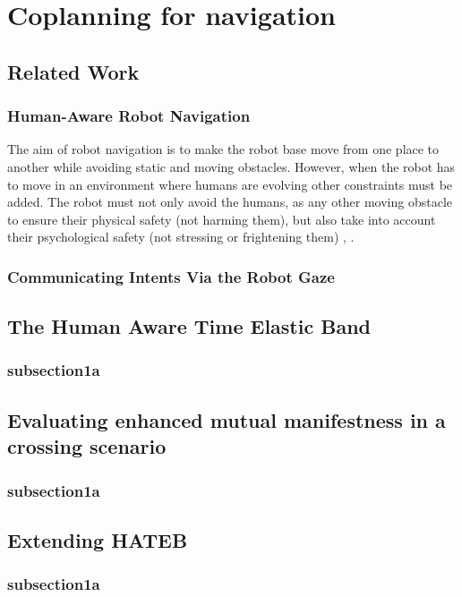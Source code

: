 \documentclass[a4paper,11pt,twoside]{StyleThese}
\begin{document}
\setcounter{chapter}{1} %
\dominitoc
\faketableofcontents
\fi

\chapter{Coplanning for navigation}
\minitoc

\section{Related Work}
\subsection{Human-Aware Robot Navigation}
The aim of robot navigation is to make the robot base move from one place to another while avoiding static and moving obstacles. However, when the robot has to move in an environment where humans are evolving other constraints must be added. The robot must not only avoid the humans, as any other moving obstacle to ensure their physical safety (not harming them), but also take into account their psychological safety (not stressing or frightening them) \cite{sisbot_human_2007}, \cite{kruse_human-aware_2013}.

\subsection{Communicating Intents Via the Robot Gaze}

\section{The Human Aware Time Elastic Band}
\subsection{subsection1a}

\section{Evaluating enhanced mutual manifestness in a crossing scenario}
\subsection{subsection1a}

\section{Extending HATEB}
\subsection{subsection1a}

\ifdefined{}
\else


\end{document}
